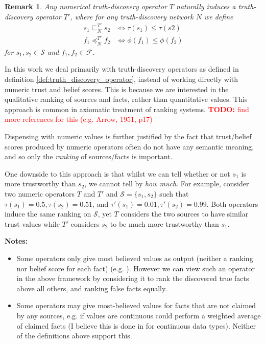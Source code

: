 \documentclass{article}
\theoremstyle{definition} \newtheorem{definition}{Definition}
\theoremstyle{definition} \newtheorem{example}{Example}
\theoremstyle{plain} \newtheorem{axiom}{Axiom}
\theoremstyle{plain} \newtheorem*{remark}{Remark}
\theoremstyle{remark} \newtheorem*{notation}{Notation}
\theoremstyle{plain} \newtheorem{lemma}{Lemma}
\theoremstyle{plain} \newtheorem{proposition}{Proposition}
\newcommand{\todo}[1] {
    \textcolor{red}{
        \textbf{TODO:} #1
    }
}
\renewcommand{\S}{\mathcal{S}}  %
\newcommand{\F}{\mathcal{F}}
\newcommand{\sle}{\sqsubseteq}
\newcommand{\fle}{\preceq}
\begin{document}
\begin{remark}
    Any numerical truth-discovery operator $T$ naturally induces a
    truth-discovery operator $T'$, where for any truth-discovery network $N$
    we define
    \begin{align*}
    s_1 \sle_N^{T'} s_2 & \iff \tau(s_1) \le \tau(s2) \\
    f_1 \fle_N^{T'} f_2 & \iff \phi(f_1) \le \phi(f_2)
    \end{align*}
    for $s_1, s_2 \in \S$ and $f_1, f_2 \in \F$.
\end{remark}

In this work we deal primarily with truth-discovery operators as defined in
definition \ref{def:truth_discovery_operator}, instead of working directly
with numeric trust and belief scores. This is because we are interested in the
qualitative ranking of sources and facts, rather than quantitative values. This
approach is common in axiomatic treatment of ranking
systems{\cite{altman,altman_personalised}}. \todo{find more references for this
(e.g. Arrow, 1951, p17)}

Dispensing with numeric values is further justified by the fact that
trust/belief scores produced by numeric operators often do not have any
semantic meaning\cite{pasternack}, and so only the \emph{ranking} of
sources/facts is important.

One downside to this approach is that whilst we can tell whether or not $s_1$
is more trustworthy than $s_2$, we cannot tell by \emph{how much}.  For
example, consider two numeric operators $T$ and $T'$ and $\S=\{s_1, s_2\}$
such that $\tau(s_1)=0.5, \tau(s_2)=0.51$, and $\tau'(s_1)=0.01,
\tau'(s_2)=0.99$. Both operators induce the same ranking on $\S$, yet $T$
considers the two sources to have similar trust values while $T'$ considers
$s_2$ to be much more trustworthy than $s_1$.

\textbf{Notes:}
\begin{itemize}

\item Some operators only give most believed values as output (neither a
ranking nor belief score for each fact) (e.g. \cite{li_conflicts}). However we
can view such an operator in the above framework by considering it to rank the
discovered true facts above all others, and ranking false facts equally.

\item Some operators may give most-believed values for facts that are not
claimed by any sources, e.g. if values are continuous could perform a weighted
average of claimed facts (I believe this is done in \cite{li_conflicts} for
continuous data types). Neither of the definitions above support this.

\end{itemize}
\end{document}

